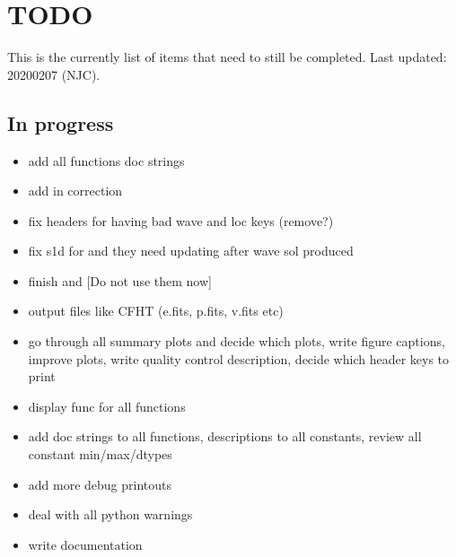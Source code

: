 \documentclass[a4paper,10pt,english]{report}
\begin{document}
\section{TODO}
\label{\detokenize{user/general/todo:todo}}\label{\detokenize{user/general/todo:id1}}\label{\detokenize{user/general/todo::doc}}
This is the currently list of items that need to still be completed.
Last updated: 2020\sphinxhyphen{}02\sphinxhyphen{}07 (NJC).


\subsection{In progress}
\label{\detokenize{user/general/todo:in-progress}}\begin{itemize}
\item {} 
add all functions doc strings

\item {} 
add in  correction

\item {} 
fix headers for having bad wave and loc keys (remove?)

\item {} 
fix s1d for  and  they need updating after wave sol produced

\item {} 
finish  and  {[}Do not use them now{]}

\item {} 
output files like CFHT (e.fits, p.fits, v.fits etc)

\item {} 
go through all summary plots and decide which plots, write figure captions,
improve plots, write quality control description, decide which header keys to print

\item {} 
display func for all functions

\item {} 
add doc strings to all functions, descriptions to all constants, review all
constant min/max/dtypes

\item {} 
add more debug printouts

\item {} 
deal with all python warnings

\item {} 
write documentation

\end{itemize}
\end{document}
